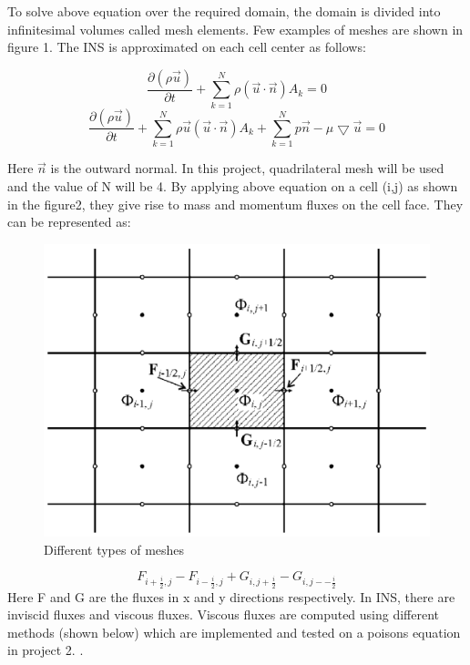 \documentclass[12pt]{elsarticle}
\begin{document}
	To solve above equation over the required domain, the domain is divided into infinitesimal volumes called mesh elements. Few examples of meshes are shown in figure 1. The INS is approximated on each cell center as follows:
	
	\begin{equation}
		\frac{\partial (\rho \overrightarrow{u})}{\partial t}+\sum\limits_{k=1}^N \rho (\overrightarrow{u} \cdot \overrightarrow{n}) A_k=0
	\end{equation}
	\begin{equation}
		\frac{\partial (\rho \overrightarrow{u})}{\partial t}+\sum\limits_{k=1}^N \rho \overrightarrow{u} (\overrightarrow{u} \cdot \overrightarrow{n}) A_k+\sum\limits_{k=1}^N p \overrightarrow{n}-\mu \bigtriangledown \overrightarrow{u}=0
	\end{equation}
	
	Here $\overrightarrow n$ is the outward normal. In this project, quadrilateral mesh will be used and the value of N will be 4. By applying above equation on a cell (i,j) as shown in the figure2, they give rise to mass and momentum fluxes on the cell face. They can be represented as:
	
	\begin{figure}[h]
		\centering\includegraphics[width=0.8\linewidth]{phi_grid.png}
		\caption{Different types of meshes}
	\end{figure}
	
	\begin{equation}
		F_{i+\frac{i}{2},j}-F_{i-\frac{i}{2},j}+G_{i,j+\frac{i}{2}}-G_{i,j--\frac{i}{2}}
	\end{equation}
	Here F and G are the fluxes in x and y directions respectively. In INS, there are inviscid fluxes and viscous fluxes. Viscous fluxes are computed using different methods (shown below) which are implemented and tested on a poisons equation in project 2. .
	
\end{document}
